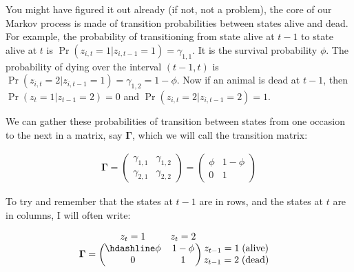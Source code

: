 \documentclass[
  12pt,
]{krantz}
\begin{document}
You might have figured it out already (if not, not a problem), the core of our Markov process is made of transition probabilities between states alive and dead. For example, the probability of transitioning from state alive at \(t-1\) to state alive at \(t\) is \(\Pr(z_{i,t} = 1 | z_{i,t-1} = 1) = \gamma_{1,1}\). It is the survival probability \(\phi\). The probability of dying over the interval \((t-1, t)\) is \(\Pr(z_{i,t} = 2 | z_{i,t-1} = 1) = \gamma_{1,2} = 1 - \phi\). Now if an animal is dead at \(t-1\), then \(\Pr(z_t = 1 | z_{t-1} = 2) = 0\) and \(\Pr(z_{i,t} = 2 | z_{i,t-1} = 2) = 1\).

We can gather these probabilities of transition between states from one occasion to the next in a matrix, say \(\mathbf{\Gamma}\), which we will call the transition matrix:

\begin{align*}
\mathbf{\Gamma} =
\left(\begin{array}{cc}
\gamma_{1,1} & \gamma_{1,2}\\
\gamma_{2,1} & \gamma_{2,2}
\end{array}\right) =
\left(\begin{array}{cc}
\phi & 1 - \phi\\
0 & 1
\end{array}\right)
\end{align*}

To try and remember that the states at \(t-1\) are in rows, and the states at \(t\) are in columns, I will often write:

\[
\begin{matrix}
& \\
\mathbf{\Gamma} =
    \left ( \vphantom{ \begin{matrix} 12 \\ 12 \end{matrix} } \right .
\end{matrix}
\hspace{-1.2em}
\begin{matrix}
    z_t=1 & z_t=2 \\ \hdashline
\phi & 1-\phi \\
0 & 1
\end{matrix}
\hspace{-0.2em}
\begin{matrix}
& \\
\left . \vphantom{ \begin{matrix} 12 \\ 12 \end{matrix} } \right )
    \begin{matrix}
    z_{t-1}=1 \; \mbox{(alive)} \\ z_{t-1}=2 \; \mbox{(dead)}
    \end{matrix}
\end{matrix}
\]
\end{document}
